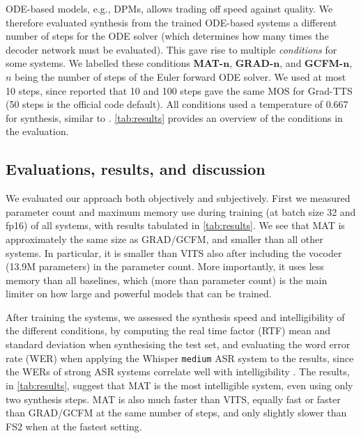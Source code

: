 \documentclass[british]{article}
\begin{document}
ODE-based models, e.g., DPMs, allows trading off speed against quality.
We therefore evaluated synthesis from the trained ODE-based systems a different number of steps for the ODE solver (which determines how many times the decoder network must be evaluated).
This gave rise to multiple \emph{conditions} for some systems.
We labelled these conditions \textbf{MAT-$\boldsymbol{n}$}, \textbf{GRAD-$\boldsymbol{n}$}, and \textbf{GCFM-$\boldsymbol{n}$}, $n$ being the number of steps of the Euler forward ODE solver.
We used at most 10 steps, since \cite{popov2021grad} reported that 10 and 100 steps gave the same MOS for Grad-TTS (50 steps is the official code default).
All conditions used a temperature of 0.667 for synthesis, similar to \cite{popov2021grad}.
\cref{tab:results} provides an overview of the conditions in the evaluation.




\subsection{Evaluations, results, and discussion}
\label{ssec:results}
We evaluated our approach both objectively and subjectively.
First we measured parameter count and maximum memory use during training (at batch size 32 and fp16) of all systems, with results tabulated in \cref{tab:results}.
We see that MAT is approximately the same size as GRAD/GCFM, and smaller than all other systems.
In particular, it is smaller than VITS also after including the vocoder (13.9M parameters) in the parameter count.
More importantly, it uses less memory than all baselines, which (more than parameter count) is the main limiter on how large and powerful models that can be trained.

After training the systems, we assessed the synthesis speed and intelligibility of the different conditions, by computing the real time factor (RTF) mean and standard deviation when synthesising the test set, and evaluating the word error rate (WER) when applying the Whisper \texttt{medium}
\cite{radford2023robust} ASR system to the results, since the WERs of strong ASR systems correlate well with intelligibility \cite{taylor2021confidence}.
The results, in \cref{tab:results}, suggest that MAT is the most intelligible system, even using only two synthesis steps.
MAT is also much faster than VITS, equally fast or faster than GRAD/GCFM at the same number of steps, and only slightly slower than FS2 when at the fastest setting.
\end{document}
